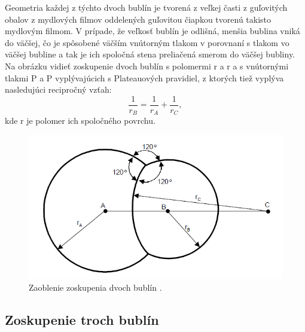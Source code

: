 \noindent Geometria každej z týchto dvoch bublín je tvorená z veľkej časti z guľovitých obalov z mydlových filmov oddelených guľovitou čiapkou tvorenú takisto mydlovým filmom. V prípade, že veľkosť bublín je odlišná, menšia bublina vniká do väčšej, čo je spôsobené väčším vnútorným tlakom v porovnaní s tlakom vo väčšej bubline a tak je ich spoločná stena preliačená smerom do väčšej bubliny. Na obrázku  vidieť zoskupenie dvoch bublín s polomermi r a r a s vnútornými tlakmi P a P vyplývajúcich s Plateauových pravidiel, z ktorých tiež vyplýva nasledujúci recipročný vzťah:
\begin{equation}
	\frac{1}{r_{B}} = \frac{1}{r_{A}} + \frac{1}{r_{C}},
\end{equation}
kde r je polomer ich spoločného povrchu.
\begin{figure}[H]
	\begin{center}
		\includegraphics[height=\imageHeight]{images/durikovic/curvature_of_double_bubble_shells}
		\caption{Zaoblenie zoskupenia dvoch bublín \cite{durikovic2001}.}
		\label{img:curvature_of_double_bubble_shells}
	\end{center}
\end{figure}

\subsection{Zoskupenie troch bublín}

